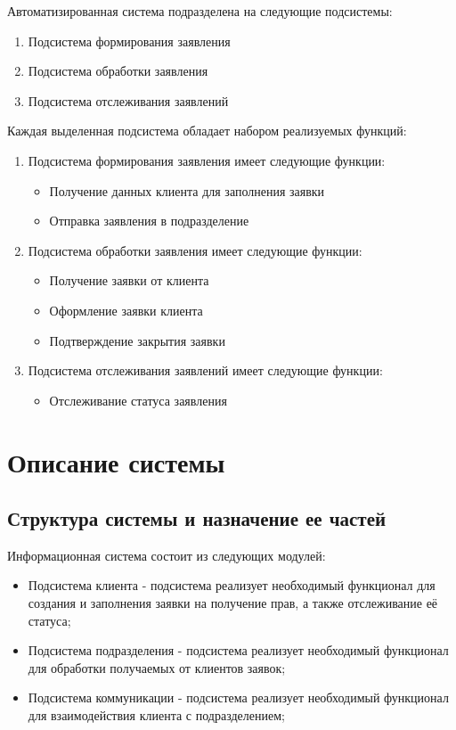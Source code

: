 \documentclass[russian, utf8, 12pt,pointsubsection,floatsubsection]{eskdtext}
\begin{document}
Автоматизированная система подразделена на следующие подсистемы:
\begin{enumerate}
    \item Подсистема формирования заявления
    \item Подсистема обработки заявления
    \item Подсистема отслеживания заявлений
\end{enumerate}

Каждая выделенная подсистема обладает набором реализуемых функций:
\begin{enumerate}
    \item Подсистема формирования заявления имеет следующие функции:
    \begin{itemize}
        \item Получение данных клиента для заполнения заявки
        \item Отправка заявления в подразделение
    \end{itemize}
    \item Подсистема обработки заявления имеет следующие функции:
    \begin{itemize}
        \item Получение заявки от клиента
        \item Оформление заявки клиента
        \item Подтверждение закрытия заявки
    \end{itemize}
    \item Подсистема отслеживания заявлений имеет следующие функции:
    \begin{itemize}
        \item Отслеживание статуса заявления
    \end{itemize}
\end{enumerate}


\section{Описание системы}

\subsection{Структура системы и назначение ее частей}
Информационная система состоит из следующих модулей:
\begin{itemize}
    \item Подсистема клиента - подсистема реализует необходимый функционал для создания и заполнения заявки на получение прав, а также отслеживание её статуса;
    \item Подсистема подразделения - подсистема реализует необходимый функционал для обработки получаемых от клиентов заявок;
    \item Подсистема коммуникации - подсистема реализует необходимый функционал для взаимодействия клиента с подразделением;
\end{itemize}
\end{document}
